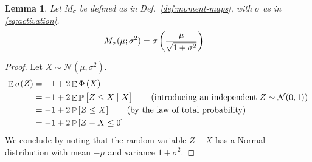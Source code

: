\documentclass[oneside, article]{memoir}
\newtheorem{lemma}{Lemma}
\DeclareMathOperator{\expect}{\mathbb{E}}
\DeclareMathOperator{\probability}{\mathbb{P}}
\begin{document}
\begin{lemma}
  Let \(M_\sigma\) be defined as in Def.~\ref{def:moment-maps}, with
  \(\sigma\) as in \eqref{eq:activation}.
  \begin{align*}
    M_\sigma(\mu; \sigma^2) &= \sigma\del{\frac{\mu}{\sqrt{1 + \sigma^2}}}
  \end{align*}
  \label{lem:mean}
\end{lemma}
\begin{proof}
  Let \(X \sim \mathcal N(\mu, \sigma^2)\).
  \begin{align}
    \expect \sigma(Z)
    &= -1+2\expect \Phi\del{X}
    \\
    &= -1+2\expect \probability \sbr{{Z \leq X} \mid X}
    \tag{introducing an independent \(Z \sim \mathcal{N}(0, 1)\)}
    \\
    &= -1+2\probability\sbr{{Z \leq X}}
    \tag{by the law of total probability}
    \\
    &= -1+2\probability \sbr{Z - X \leq 0}
  \end{align}
  We conclude by noting that the random variable \(Z - X\) has a
  Normal distribution with mean \(-\mu\) and variance \(1 + \sigma^2\).
\end{proof}
\end{document}
